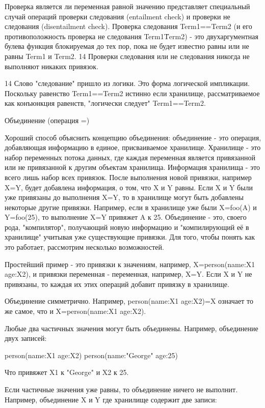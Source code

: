 Проверка является ли переменная равной значению представляет специальный случай операций проверки следования (entailment check) и проверки не следования (disentailment check). Проверка следования Term1==Term2 (и его противоположность проверка не следования Term1\=Term2) - это двухаргументная булева функция блокируемая до тех пор, пока не будет известно равны или не равны Term1 и Term2. 14 Проверки следования или не следования никогда не выполняют никаких привязок.

14 Слово "следование" пришло из логики. Это форма логической импликации. Поскольку равенство Term1==Term2 истинно если хранилище, рассматриваемое как конъюнкция равенств, "логически следует" Term1==Term2.

Объединение (операция =)

Хороший способ объяснить концепцию объединения: объединение - это операция, добавляющая информацию в единое, присваиваемое хранилище. Хранилище - это набор переменных потока данных, где каждая переменная является привязанной или не привязанной к другим объектам хранилища. Информация хранилища - это всего лишь набор всех привязок. После выполнения новой привязки, например X=Y, будет добавлена информация, о том, что X и Y равны. Если X и Y были уже привязаны до выполнения X=Y, то в хранилище могут быть добавлены некоторые другие привязки. Например, если в хранилище уже были X=foo(A) и Y=foo(25), то выполнение X=Y привяжет A к 25. Объединение - это, своего рода, "компилятор", получающий новую информацию и "компилирующий её в хранилище" учитывая уже существующие привязки. Для того, чтобы понять как это работает, рассмотрим несколько возможностей.

Простейший пример - это привязки к значениям, например, X=person(name:X1 age:X2), и привязки переменная - переменная, например, X=Y. Если X и Y не привязаны, то каждая их этих операций добавит привязку в хранилище.

Объединение симметрично. Например, person(name:X1 age:X2)=X означает то же самое, что и X=person(name:X1 age:X2).

Любые два частичных значения могут быть объединены. Например, объединение двух записей:

person(name:X1 age:X2)
person(name:"George" age:25)

Что привяжет X1 к "George" и X2 к 25.

Если частичные значения уже равны, то объединение ничего не выполнит. Например, объединение X и Y где хранилище содержит две записи:

